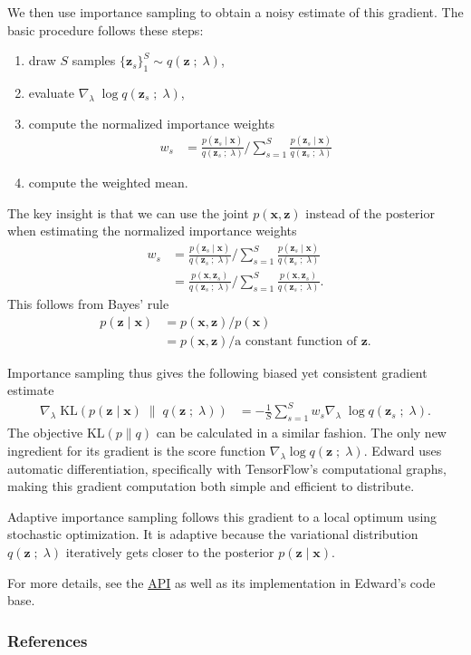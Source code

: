 We then use importance sampling to obtain a noisy estimate of this gradient.
The basic procedure follows these steps:
\begin{enumerate}
  \item draw $S$ samples $\{\mathbf{z}_s\}_1^S \sim q(\mathbf{z}\;;\;\lambda)$,
  \item evaluate $\nabla_\lambda\; \log q(\mathbf{z}_s\;;\;\lambda)$,
  \item compute the normalized importance weights
  \begin{align*}
    w_s
    &=
    \frac{p(\mathbf{z}_s \mid \mathbf{x})}{q(\mathbf{z}_s\;;\;\lambda)}
    \Bigg/
    \sum_{s=1}^{S}
    \frac{p(\mathbf{z}_s \mid \mathbf{x})}{q(\mathbf{z}_s\;;\;\lambda)}
  \end{align*}
  \item compute the weighted mean.
\end{enumerate}
The key insight is that we can use the joint $p(\mathbf{x},\mathbf{z})$ instead of the posterior
when estimating the normalized importance weights
\begin{align*}
  w_s
  &=
  \frac{p(\mathbf{z}_s \mid \mathbf{x})}{q(\mathbf{z}_s\;;\;\lambda)}
  \Bigg/
  \sum_{s=1}^{S}
  \frac{p(\mathbf{z}_s \mid \mathbf{x})}{q(\mathbf{z}_s\;;\;\lambda)} \\
  &=
  \frac{p(\mathbf{x}, \mathbf{z}_s)}{q(\mathbf{z}_s\;;\;\lambda)}
  \Bigg/
  \sum_{s=1}^{S}
  \frac{p(\mathbf{x}, \mathbf{z}_s)}{q(\mathbf{z}_s\;;\;\lambda)}.
\end{align*}
This follows from Bayes' rule
\begin{align*}
  p(\mathbf{z} \mid \mathbf{x})
  &=
  p(\mathbf{x}, \mathbf{z}) / p(\mathbf{x})\\
  &=
  p(\mathbf{x}, \mathbf{z}) / \text{a constant function of }\mathbf{z}.
\end{align*}

Importance sampling thus gives the following biased yet consistent gradient
estimate
\begin{align*}
\nabla_\lambda\;
  \text{KL}(
  p(\mathbf{z} \mid \mathbf{x})
  \;\|\;
  q(\mathbf{z}\;;\;\lambda)
  )
  &=
  -
  \frac{1}{S}
  \sum_{s=1}^S
  w_s
  \nabla_\lambda\; \log q(\mathbf{z}_s\;;\;\lambda).
\end{align*}
The objective $\text{KL}(p\|q)$ can be calculated in a similar fashion.
The only new ingredient for its gradient is the score function
$\nabla_\lambda \log q(\mathbf{z}\;;\;\lambda)$.  Edward uses automatic
differentiation, specifically with TensorFlow's computational graphs,
making this gradient computation both simple and efficient to
distribute.

Adaptive importance sampling follows this gradient to a local optimum using
stochastic optimization. It is adaptive because the variational distribution
$q(\mathbf{z}\;;\;\lambda)$ iteratively gets closer to the posterior $p(\mathbf{z} \mid \mathbf{x})$.

For more details, see the \href{/api/}{API} as well as its
implementation in Edward's code base.

\subsubsection{References}\label{references}
